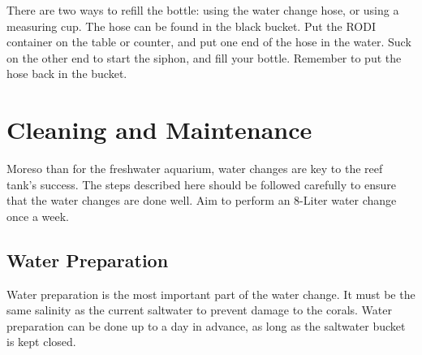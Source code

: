 \documentclass{report}
\begin{document}
There are two ways to refill the bottle: using the water change hose, or using a measuring cup. The hose can be found in the black bucket. Put the RODI container on the table or counter, and put one end of the hose in the water. Suck on the other end to start the siphon, and fill your bottle. Remember to put the hose back in the bucket. 
\section{Cleaning and Maintenance}
Moreso than for the freshwater aquarium, water changes are key to the reef tank's success. The steps described here should be 
followed carefully to ensure that the water changes are done well. Aim to perform an 8-Liter water change once a week.

\subsection{Water Preparation}
\label{sec:waterprep}
Water preparation is the most important part of the water change. It must be the same salinity as the current saltwater to 
prevent damage to the corals. Water preparation can be done up to a day in advance, as long as the saltwater bucket is kept 
closed. 
\end{document}
